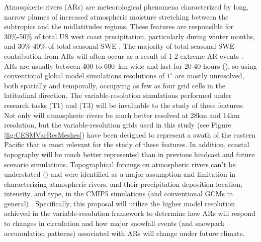 \documentclass[11pt]{article}
\begin{document}
Atmospheric rivers (ARs) are meteorological phenomena characterized by long, narrow plumes of increased atmospheric moisture stretching between the subtropics and the midlatitudes regions.  These features are responsible for 30\%-50\% of total US west coast precipitation, particularly during winter months, and 30\%-40\% of total seasonal SWE \citep{dettinger2011atmospheric}.  The majority of total seasonal SWE contribution from ARs will often occur as a result of 1-2 extreme AR events \citep{guan2010extreme}.  ARs are usually between 400 to 600\ km wide and last for 20-40 hours (\cite{gimeno2014atmospheric}), so using conventional global model simulations resolutions of $1^\circ$ are mostly unresolved, both spatially and temporally, occupying as few as four grid cells in the latitudinal direction.  The variable-resolution simulations performed under research tasks (T1) and (T3) will be invaluable to the study of these features: Not only will atmospheric rivers be much better resolved at 28km and 14km resolution, but the variable-resolution grids used in this study (see Figure \ref{fig:CESMVarResMeshes}) have been designed to represent a swath of the eastern Pacific that is most relevant for the study of these features.  In addition, coastal topography will be much better represented than in previous hindcast and future scenario simulations.  Topographical forcings on atmospheric rivers can't be understated (\cite{leung2009atmospheric, dettinger2011atmospheric, rutz2014climatological, gimeno2014atmospheric}) and were identified as a major assumption and limitation in characterizing atmospheric rivers, and their precipitation deposition location, intensity, and type, in the CMIP5 simulations (and conventional GCMs in general) \citep{dettinger2011atmospheric}.  Specifically, this proposal will utilize the higher model resolution achieved in the variable-resolution framework to determine how ARs will respond to changes in circulation and how major snowfall events (and snowpack accumulation patterns) associated with ARs will change under future climate.
\end{document}
